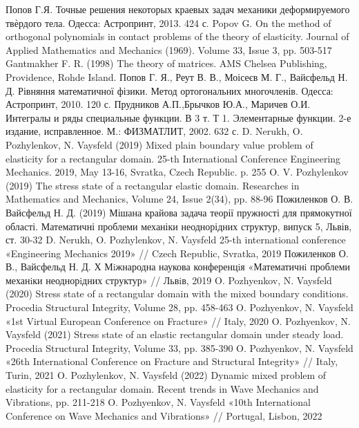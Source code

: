 \documentclass[a4paper,14pt]{extarticle}
\numberwithin{equation}{section}
\begin{document}
\begin{thebibliography}{1}
    Попов Г.Я. Точные решения некоторых краевых задач механики деформируемого твѐрдого тела. Одесса: Астропринт, 2013. 424 с.
    Popov G. On the method of orthogonal polynomials in contact problems of the theory of elasticity. Journal of Applied Mathematics and Mechanics (1969). Volume 33, Issue 3, pp. 503-517
    Gantmakher F. R. (1998) The theory of matrices. AMS Chelsea Publishing, Providence, Rohde Island.
    Попов Г. Я., Реут В. В., Моісеєв М. Г., Вайсфельд Н. Д. Рівняння математичної фізики. Метод ортогональних многочленів. Одесса: Астропринт, 2010. 120 с.
    Прудников А.П.,Брычков Ю.А., Маричев О.И. Интегралы и ряды специальные функции. В 3 т. Т 1. Элементарные функции. 2-е издание, исправленное. М.: ФИЗМАТЛИТ, 2002. 632 с.
    D. Nerukh, O. Pozhylenkov, N. Vaysfeld (2019) Mixed plain boundary value problem of elasticity for a rectangular domain. 25-th International Conference Engineering Mechanics. 2019, May 13-16, Svratka, Czech Republic. p. 255
    O. V. Pozhylenkov (2019) The stress state of a rectangular elastic domain. Researches in Mathematics and Mechanics, Volume 24, Issue 2(34), pp. 88-96
    Пожиленков О. В. Вайсфельд Н. Д. (2019) Мішана крайова задача теорії пружності для прямокутної області. Математичні проблеми механіки неоднорідних структур, випуск 5, Львів, ст. 30-32
    D. Nerukh, O. Pozhylenkov, N. Vaysfeld 25-th international conference «Engineering Mechanics 2019» // Czech Republic, Svratka, 2019
    Пожиленков О. В., Вайсфельд Н. Д. Х Мiжнародна наукова конференцiя «Математичнi проблеми механiки неоднорiдних структур» // Львiв, 2019
    O. Pozhyenkov, N. Vaysfeld (2020) Stress state of a rectangular domain with the mixed boundary conditions. Procedia Structural Integrity, Volume 28, pp. 458-463
    O. Pozhyenkov, N. Vaysfeld «1st Virtual European Conference on Fracture» // Italy, 2020
    O. Pozhyenkov, N. Vaysfeld (2021) Stress state of an elastic rectangular domain under steady load. Procedia Structural Integrity, Volume 33, pp. 385-390
    O. Pozhyenkov, N. Vaysfeld «26th International Conference on Fracture and Structural Integrity» // Italy, Turin, 2021
    O. Pozhylenkov, N. Vaysfeld (2022) Dynamic mixed problem of elasticity for a rectangular domain. Recent trends in Wave Mechanics and Vibrations, pp. 211-218
    O. Pozhyenkov, N. Vaysfeld «10th International Conference on Wave Mechanics and Vibrations» // Portugal, Lisbon, 2022
\end{thebibliography}
\newpage
\end{document}
